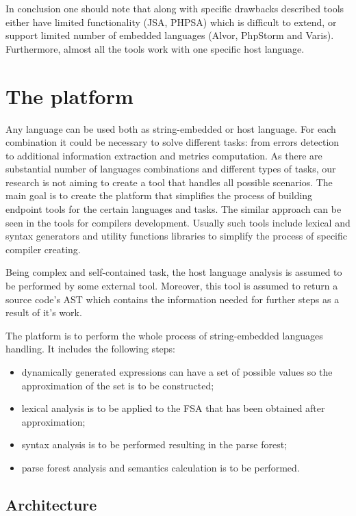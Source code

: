 \documentclass{sig-alternate-05-2015}
\begin{document}
In conclusion one should note that along with specific drawbacks described tools either have limited functionality (JSA, PHPSA) which is difficult to extend, or support limited number of embedded languages (Alvor, PhpStorm and Varis). Furthermore, almost all the tools work with one specific host language.

\section{The platform}

Any language can be used both as string-embedded or host language. For each combination it could be necessary to solve different tasks: from errors detection to additional information extraction and metrics computation. As there are substantial number of languages combinations and different types of tasks, our research is not aiming to create a tool that handles all possible scenarios. The main goal is to create the platform that simplifies the process of building endpoint tools for the certain languages and tasks. The similar approach can be seen in the tools for compilers development. Usually such tools include lexical and syntax generators and utility functions libraries to simplify the process of  specific compiler creating.

Being complex and self-contained task, the host language analysis is assumed to be performed by some external tool. Moreover, this tool is assumed to return a source code's AST which contains the information needed for further steps as a result of it's work.

The platform is to perform the whole process of string-embedded languages handling. It includes the following steps:
\begin{itemize}
\item dynamically generated expressions can have a set of possible values so the approximation of the set is to be constructed;
\item lexical analysis is to be applied to the FSA that has been obtained after approximation;
\item syntax analysis is to be performed resulting in the parse forest;
\item parse forest analysis and semantics calculation is to be performed.
\end{itemize}

\subsection{Architecture}
\end{document}
